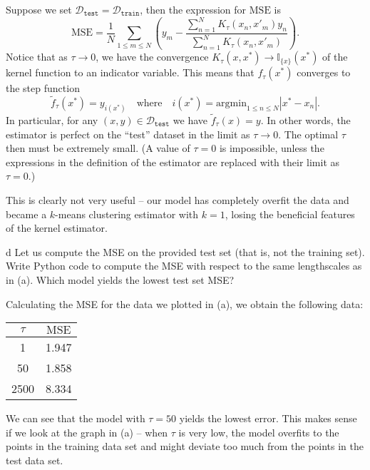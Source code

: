\documentclass[expanded]{lkx_pset}
\begin{document}
\begin{parts}
  Suppose we set $\mathcal{D}_{\texttt{test}}=\mathcal{D}_{\texttt{train}}$, then the expression for $\mathrm{MSE}$ is 
  \[
    \mathrm{MSE} = \frac{1}{N}\sum_{1\leq m \leq N} \left(y_m - \frac{\sum^N_{n=1} K_\tau(x_n, x'_m)y_n}{\sum^N_{n=1} K_\tau(x_n, x'_m)}\right).
  \]
  Notice that as $\tau \to 0$, we have the convergence $K_\tau(x, x^*)\to \mathbb{I}_{\{x\}}(x^*)$ of the kernel function to an indicator variable. This means that $f_\tau(x^*)$ converges to the step function
  \[
    \widetilde{f}_\tau(x^*) = y_{i(x^*)}\quad\textrm{where}\quad i(x^*)=\mathrm{argmin}_{1\leq n \leq N} |x^* - x_n|.
  \]
  In particular, for any $(x,y)\in \mathcal{D}_\texttt{test}$ we have $\widetilde{f}_\tau(x)=y$. In other words, the estimator is perfect on the ``test'' dataset in the limit as $\tau \to 0$. The optimal $\tau$ then must be extremely small. (A value of $\tau=0$ is impossible, unless the expressions in the definition of the estimator are replaced with their limit as $\tau = 0$.)

  This is clearly not very useful -- our model has completely overfit the data and became a $k$-means clustering estimator with $k=1$, losing the beneficial features of the kernel estimator.


  \begin{part}{d}
    Let us compute the MSE on the provided test set (that is, not the training set). Write Python code to compute the MSE with respect to the same lengthscales as in (a). Which model yields the lowest test set MSE? 
  \end{part}

  Calculating the MSE for the data we plotted in (a), we obtain the following data:
  \begin{center}
    \renewcommand*{\arraystretch}{1.2}
    \begin{tabular}{|c|c|} 
     \hline
     $\tau$ & $\textrm{MSE}$ \\ 
     \hline
     1 & 1.947\\
     50 & 1.858\\
     2500 & 8.334\\
     \hline
    \end{tabular}
  \end{center}
  We can see that the model with $\tau = 50$ yields the lowest error. This makes sense if we look at the graph in (a) -- when $\tau$ is very low, the model overfits to the points in the training data set and might deviate too much from the points in the test data set.


\end{parts}
\end{document}
